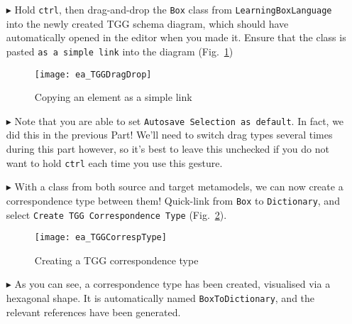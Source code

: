 \begin{itemize}
\item[$\blacktriangleright$] Hold \texttt{ctrl}, then drag-and-drop the \texttt{Box} class from \texttt{Learning\-Box\-Language} into the newly
created TGG schema diagram, which should have automatically opened in the editor when you made it. Ensure that the class is pasted \texttt{as a simple link} into the
diagram (Fig.~\ref{fig:TGGdragDrop})

\begin{figure}[htbp]
\begin{center}
  \texttt{[image: ea\_TGGDragDrop]}
  \caption{Copying an element as a simple link} 
  \label{fig:TGGdragDrop}
\end{center}
\end{figure}

\item[$\blacktriangleright$] Note that you are able to set \texttt{Autosave Selection as default}. In fact, we did this in the previous Part! We'll need to
switch drag types several times during this part however, so it's best to leave this unchecked if you do not want to hold \texttt{ctrl} each time you use this
gesture.

\item[$\blacktriangleright$] With a class from both source and target metamodels, we can now create a correspondence type between them! Quick-link from
\texttt{Box} to \texttt{Dictionary}, and select \texttt{Create TGG Corres\-pon\-dence Type} (Fig.~\ref{fig:create_correspondence}).

\newpage

\begin{figure}[htbp]
\begin{center}
  \texttt{[image: ea\_TGGCorrespType]}
  \caption{Creating a TGG correspondence type} 
  \label{fig:create_correspondence}
\end{center}
\end{figure}

\item[$\blacktriangleright$] As you can see, a correspondence type has been created, visualised via a hexagonal shape. It is automatically named
\texttt{BoxToDiction\-ary}, and the relevant references have been generated.



\end{itemize}

